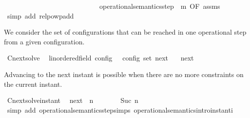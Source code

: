 \begin{isabellebody}
\ \ \ \ \ \ \ \ \ \ \ \ \ \ \ \ \ \ \ \ \ \ \ \ \ \ \ \ {\isacartoucheopen}operational{\isacharunderscore}semantics{\isacharunderscore}step\ {\isacharcircum}{\isacharcircum}\ m{\isacartoucheclose}{\isacharcomma}\ OF\ assms{\isacharbrackright}\isanewline
{}\isamarkupfalse%
\ {\isacharparenleft}simp\ add{\isacharcolon}\ relpowp{\isacharunderscore}add{\isacharparenright}%
\endisatagproof
{\isafoldproof}%
%
\isadelimproof
%
\endisadelimproof
%
\begin{isamarkuptext}%
We consider the set of configurations that can be reached in one operational
  step from a given configuration.%
\end{isamarkuptext}\isamarkuptrue%
\isamarkupfalse%
\ Cnext{\isacharunderscore}solve\isanewline
\ \ {\isacharcolon}{\isacharcolon}{\isacartoucheopen}{\isacharparenleft}{\isacharprime}{\isasymtau}{\isacharcolon}{\isacharcolon}linordered{\isacharunderscore}field{\isacharparenright}\ config\ {\isasymRightarrow}\ {\isacharprime}{\isasymtau}\ config\ set{\isacartoucheclose}\ {\isacharparenleft}{\isacartoucheopen}{\isasymC}\isactrlsub n\isactrlsub e\isactrlsub x\isactrlsub t\ {\isacharunderscore}{\isacartoucheclose}{\isacharparenright}\isanewline
{}\isanewline
\ \ {\isacartoucheopen}{\isasymC}\isactrlsub n\isactrlsub e\isactrlsub x\isactrlsub t\ {\isasymS}\ {\isasymequiv}\ {\isacharbraceleft}\ {\isasymS}{\isacharprime}{\isachardot}\ {\isasymS}\ {\isasymhookrightarrow}\ {\isasymS}{\isacharprime}\ {\isacharbraceright}{\isacartoucheclose}%
\begin{isamarkuptext}%
Advancing to the next instant is possible when there are no more constraints 
  on the current instant.%
\end{isamarkuptext}\isamarkuptrue%
\isamarkupfalse%
\ Cnext{\isacharunderscore}solve{\isacharunderscore}instant{\isacharcolon}\isanewline
\ \ {\isacartoucheopen}{\isacharparenleft}{\isasymC}\isactrlsub n\isactrlsub e\isactrlsub x\isactrlsub t\ {\isacharparenleft}{\isasymGamma}{\isacharcomma}\ n\ {\isasymturnstile}\ {\isacharbrackleft}{\isacharbrackright}\ {\isasymtriangleright}\ {\isasymPhi}{\isacharparenright}{\isacharparenright}\ {\isasymsupseteq}\ {\isacharbraceleft}\ {\isasymGamma}{\isacharcomma}\ Suc\ n\ {\isasymturnstile}\ {\isasymPhi}\ {\isasymtriangleright}\ {\isacharbrackleft}{\isacharbrackright}\ {\isacharbraceright}{\isacartoucheclose}\isanewline
%
\isadelimproof
%
\endisadelimproof
%
\isatagproof
{}\isamarkupfalse%
\ {\isacharparenleft}simp\ add{\isacharcolon}\ operational{\isacharunderscore}semantics{\isacharunderscore}step{\isachardot}simps\ operational{\isacharunderscore}semantics{\isacharunderscore}intro{\isachardot}instant{\isacharunderscore}i{\isacharparenright}%

\end{isabellebody}
